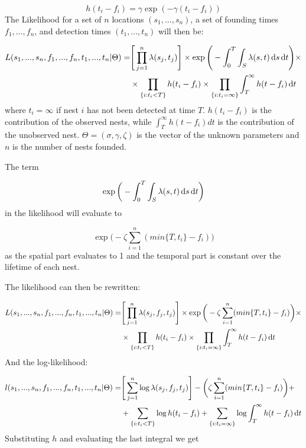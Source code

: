\[
h(t_{i} - f_{i}) = \gamma \exp (- \gamma(t_{i} - f_{i}))
\]
The Likelihood for a set of $n$ locations $(s_{1}, ... , s_{n})$, a set of founding times $f_{1}, ... , f_{n}$, and detection times $(t_{1},  ... , t_{n})$ will then be:

\[
\begin{aligned}
L(s_{1}, ..., s_{n}, f_{1}, ..., f_{n}, t_{1}, ..., t_{n} | \Theta) = & \Bigg[ \prod_{j=1}^{n} \lambda(s_{j}, t_{j}) \Bigg] \times \exp \Bigg(- \int_{0}^{T} \int_{S} \lambda(s, t) \operatorname{d}\!{s} \operatorname{d}\!{t} \Bigg) \times \\ 
& \times \prod_{\{ i : t_{i} < T \} } h (t_{i} - f_{i}) \times \prod_{ \{ i : t_{i} = \infty \} } \int_{T}^{\infty} h(t - f_{i}) \operatorname{d}\!{t}
\end{aligned}
\]
where $t_{i} = \infty$ if nest $i$ has not been detected at time $T$. $h(t_{i} - f_{i})$ is the contribution of the observed nests, while $\int_{T}^{\infty} h(t - f_{i}) dt$ is the contribution of the unobserved nest. $\Theta= ( \sigma, \gamma, \zeta)$ is the vector of the unknown parameters and $n$ is the number of nests founded.

The term 

\begin{equation}
\exp \bigg(- \int_{0}^{T} \int_{S} \lambda(s, t)\operatorname{d}\!{s} \operatorname{d}\!{t} \bigg)
\end{equation}
in the likelihood will evaluate to 


\[
\exp \bigg(- \zeta \sum_{i=1}^{n} (min\{ T, t_i \} - f_i) \bigg)
\]
as the spatial part evaluates to 1 and the temporal part is constant over the lifetime of each nest.

The likelihood can then be rewritten:

\[
\begin{aligned}
L(s_{1}, ..., s_{n}, f_{1}, ..., f_{n}, t_{1}, ..., t_{n} | \Theta) = & \Bigg[ \prod_{j=1}^{n} \lambda(s_{j},f_{j}, t_{j}) \Bigg] \times \exp \bigg(-\zeta \sum_{i=1}^{n} (min\{ T, t_i \} - f_i) \bigg)  \times \\
& \times \prod_{\{ i : t_{i} < T \} }  h (t_{i} - f_{i}) \times \prod_{ \{ i : t_{i} = \infty \} } \int_{T}^{\infty} h(t - f_{i}) \operatorname{d}\!{t}
\end{aligned}
\]
And the log-likelihood:

\[
\begin{aligned}
l(s_{1}, ..., s_{n}, f_{1}, ..., f_{n}, t_{1}, ..., t_{n} | \Theta) = & \Bigg[ \sum_{j=1}^{n} \log \lambda(s_{j},f_{j}, t_{j}) \Bigg] - \bigg(\zeta \sum_{i=1}^{n} (min\{ T, t_i \} - f_i) \bigg)  + \\
& + \sum_{\{ i : t_{i} < T \} }  \log h (t_{i} - f_{i}) + \sum_{ \{ i : t_{i} = \infty \} } \log \int_{T}^{\infty} h(t - f_{i}) \operatorname{d}\!{t}
\end{aligned}
\]
Substituting $h$ and evaluating the last integral we get 


